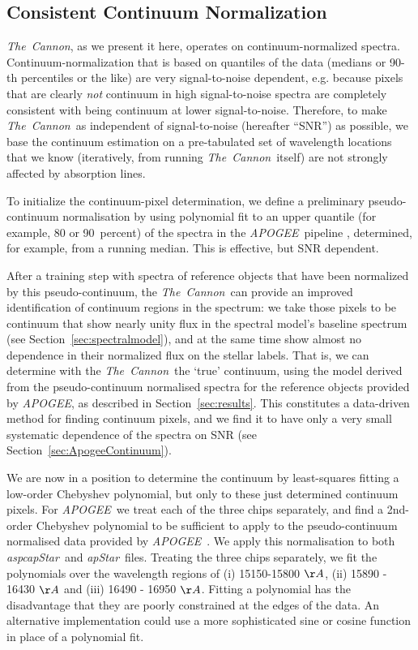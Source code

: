 \documentclass[12pt, preprint]{aastex}
\newcommand{\sectionname}{Section}
\newcommand{\tc}{\textsl{The~Cannon}}
\newcommand{\apogee}{\textsl{APOGEE}}
\newcommand{\aspcapstar}{\textsl{aspcapStar}}
\newcommand{\apstar}{\textsl{apStar}}
\begin{document}
\subsection{Consistent Continuum Normalization}\label{sec:ContNorm}

\tc, as we present it here, operates on continuum-normalized spectra.
Continuum-normalization that is based on quantiles of the data (medians or 90-th percentiles or the like)
are very signal-to-noise dependent, e.g. because pixels that are clearly \emph{not} continuum in high signal-to-noise
spectra are completely consistent with being continuum at lower signal-to-noise.
Therefore, to make \tc\ as independent of signal-to-noise (hereafter ``SNR'') as possible,
we base the continuum estimation on a pre-tabulated set of wavelength locations that we know
(iteratively, from running \tc\ itself) are not strongly affected by absorption lines.

To initialize the continuum-pixel determination,
we define a preliminary pseudo-continuum normalisation by 
using polynomial fit to an upper quantile (for example, 80 or 90~percent) of the spectra
 in the \apogee\ pipeline \citep{Meszaros2013}, determined, for example, from a running median.
  This is effective, but SNR dependent.
  
After a training step with spectra of reference objects that have been  normalized  by this pseudo-continuum,
the \tc\ can provide an improved identification of continuum regions in the spectrum: 
we take those pixels to be continuum that show nearly unity flux in the spectral model's baseline spectrum (see \sectionname~\ref{sec:spectralmodel}), and at the same time show almost no dependence in their normalized flux on the stellar labels.
That is, we can determine with the \tc\ the `true' continuum, using the model derived from the pseudo-continuum normalised spectra for the reference objects provided by \apogee, as described in \sectionname~\ref{sec:results}. This constitutes a data-driven method for finding continuum pixels, and we find it to have only a very small systematic dependence of the spectra on SNR (see \sectionname~\ref{sec:ApogeeContinuum}).

We are now in a position to determine the continuum by least-squares fitting a low-order Chebyshev polynomial, but only to these just determined continuum pixels.
For \apogee\ we treat each of the three chips separately, and find a 2nd-order Chebyshev polynomial to be sufficient to apply to the pseudo-continuum normalised data provided by \apogee\ . We apply this normalisation to both \aspcapstar\ and \apstar\ files. Treating the three chips separately, we fit the polynomials over the wavelength regions of (i) 15150-15800 $\AA$, (ii) 15890 - 16430 $\AA$ and (iii) 16490 - 16950 $\AA$. Fitting a polynomial has the disadvantage that they are poorly constrained at the edges of the data. An alternative implementation could use a more sophisticated sine or cosine function in place of a polynomial fit. 
\end{document}
